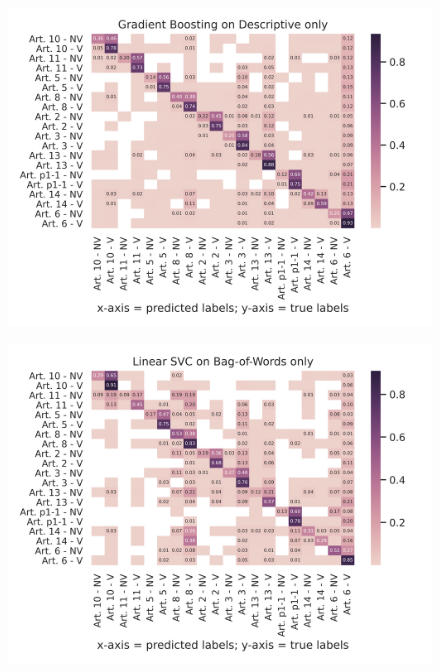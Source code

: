 \documentclass{article}
\begin{document}
\begin{figure}[!htb]
    \centering
    \includegraphics[scale=0.7]{data/analysis/cm/multiclass_cm_test_gradient_boosting_descriptive_only.png}  
\end{figure}
\begin{figure}[!htb]
    \centering
    \includegraphics[scale=0.7]{data/analysis/cm/multiclass_cm_test_linear_svc_bag-of-words_only.png}  
\end{figure}
\end{document}

